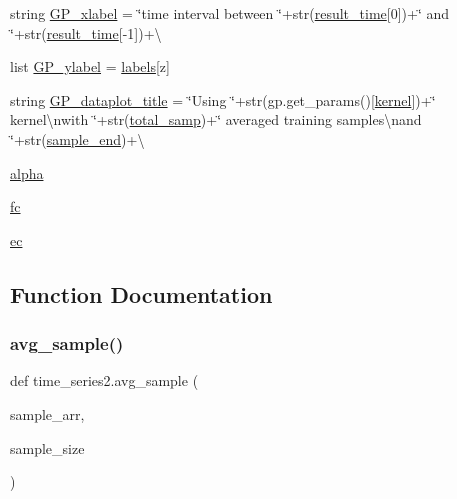 \begin{DoxyCompactItemize}
string \mbox{\hyperlink{namespacetime__series2_ab96e591ad1ad71d491e9c0911dbcfb3f}{G\+P\+\_\+xlabel}} = \char`\"{}time interval between \char`\"{}+str(\mbox{\hyperlink{namespacetime__series2_a8bc1ba75be8714303adfe853be1fdfa7}{result\+\_\+time}}\mbox{[}0\mbox{]})+\char`\"{} and \char`\"{}+str(\mbox{\hyperlink{namespacetime__series2_a8bc1ba75be8714303adfe853be1fdfa7}{result\+\_\+time}}\mbox{[}-\/1\mbox{]})+\textbackslash{}
\item 
list \mbox{\hyperlink{namespacetime__series2_a21760fd1a155e704a4ebc53bcdd542dd}{G\+P\+\_\+ylabel}} = \mbox{\hyperlink{namespacetime__series2_aca78083d23e0850ea4120fa6817af6fb}{labels}}\mbox{[}z\mbox{]}
\item 
string \mbox{\hyperlink{namespacetime__series2_abbce76511798b545cbd2d31ff635e1e0}{G\+P\+\_\+dataplot\+\_\+title}} = \char`\"{}Using \char`\"{}+str(gp.\+get\+\_\+params()\mbox{[}\textquotesingle{}\mbox{\hyperlink{namespacetime__series2_a79d2d803d9f27eb4ed08932199d79a23}{kernel}}\textquotesingle{}\mbox{]})+\char`\"{} kernel\textbackslash{}nwith \char`\"{}+str(\mbox{\hyperlink{namespacetime__series2_af8e48fc6d3d4ad2c551a1b3df864aa51}{total\+\_\+samp}})+\char`\"{} averaged training samples\textbackslash{}nand \char`\"{}+str(\mbox{\hyperlink{namespacetime__series2_ad170197f80cacfa1a597f0cc81af1ed5}{sample\+\_\+end}})+\textbackslash{}
\item 
\mbox{\hyperlink{namespacetime__series2_ab77f3dac8f9c1b3b736d630b63ea8d35}{alpha}}
\item 
\mbox{\hyperlink{namespacetime__series2_ab333f29befe468b5e60f2cfee44c97d2}{fc}}
\item 
\mbox{\hyperlink{namespacetime__series2_a99eb3f92724746be5d1ddd4434cb4b4f}{ec}}
\end{DoxyCompactItemize}


\subsection{Function Documentation}
\mbox{\label{namespacetime__series2_a831b2ebbb3b93f1a189a11b798867bf2}} 
\subsubsection{\texorpdfstring{avg\+\_\+sample()}{avg\_sample()}}
{\footnotesize\ttfamily def time\+\_\+series2.\+avg\+\_\+sample (\begin{DoxyParamCaption}\item[{}]{sample\+\_\+arr,  }\item[{}]{sample\+\_\+size }\end{DoxyParamCaption})}

